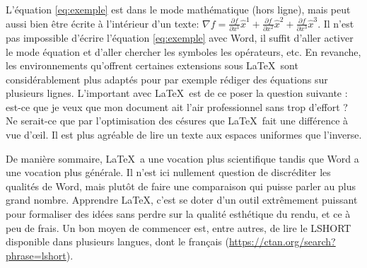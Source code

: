 	L'équation \ref{eq:exemple} est dans le mode mathématique (hors ligne), mais peut aussi bien être écrite à l'intérieur d'un texte:
	\(
	\nabla f =%
	\frac{\partial f}{\partial x^1}\widehat{x}^1%
	+\frac{\partial f}{\partial x^2}\widehat{x}^2%
	+\frac{\partial f}{\partial x^3}\widehat{x}^3
	\).
	Il n'est pas impossible d'écrire l'équation \ref{eq:exemple} avec Word, il suffit d'aller activer le mode équation et d'aller chercher les symboles les opérateurs, etc. En revanche, les environnements qu'offrent certaines extensions sous \LaTeX~sont considérablement plus adaptés pour par exemple rédiger des équations sur plusieurs lignes. L'important avec \LaTeX~est de ce poser la question suivante : est-ce que je veux que mon document ait l'air professionnel sans trop d'effort ? Ne serait-ce que par l'optimisation des césures que \LaTeX~fait une différence à vue d'\oe il. Il est plus agréable de lire un texte aux espaces uniformes que l'inverse.
	\par De manière sommaire, \LaTeX~a une vocation plus scientifique tandis que Word a une vocation plus générale. Il n'est ici nullement question de discréditer les qualités de Word, mais plutôt de faire une comparaison qui puisse parler au plus grand nombre. Apprendre \LaTeX, c'est se doter d'un outil extrêmement puissant pour formaliser des idées sans perdre sur la qualité esthétique du rendu, et ce à peu de frais. Un bon moyen de commencer est, entre autres, de lire le LSHORT disponible dans plusieurs langues, dont le français (\url{https://ctan.org/search?phrase=lshort}).
	
